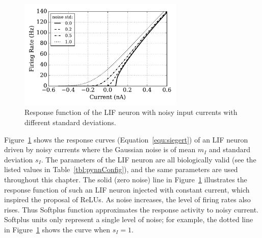 	
	\begin{figure}[bt]
		\centering
		\includegraphics[width=0.7\textwidth]{pics_iconip/1.pdf}
		\caption[Response function of the LIF neuron.]{Response function of the LIF neuron with noisy input currents with different standard deviations.}
		\label{Fig:physics}
	\end{figure}
	
	Figure~\ref{Fig:physics} shows the response curves (Equation~\ref{equ:siegert}) of an LIF neuron driven by noisy currents where the Gaussian noise is of mean $m_I$ and standard deviation $s_I$.
	The parameters of the LIF neuron are all biologically valid (see the listed values in Table~\ref{tbl:pynnConfig}), and the same parameters are used throughout this chapter.
	The solid (zero noise) line in Figure~\ref{Fig:physics} illustrates the response function of such an LIF neuron injected with constant current, which inspired the proposal of ReLUs.
	As noise increases, the level of firing rates also rises.
	Thus Softplus function approximates the response activity to noisy current.
	Softplus units only represent a single level of noise; for example, the dotted line in Figure~\ref{Fig:physics} shows the curve when $s_I=1$.
	
